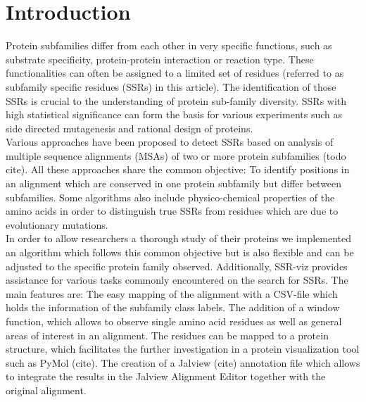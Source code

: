 \documentclass{bioinfo}
\begin{document}
\maketitle

\section{Introduction}

Protein subfamilies differ from each other in very specific functions, such as substrate specificity,
protein-protein interaction or reaction type. These functionalities can often be assigned 
to a limited set of residues (referred to as subfamily specific residues (SSRs) in this article).
The identification of those SSRs is crucial to the understanding of protein sub-family diversity.
SSRs with high statistical significance can form the basis for various experiments 
such as side directed mutagenesis and rational design of proteins. \\
%
Various approaches have been proposed to detect SSRs based on analysis of multiple sequence 
alignments (MSAs) of two or more protein subfamilies (todo cite). All these approaches share the 
common objective: To identify positions in an alignment which are conserved in one 
protein subfamily but differ between subfamilies. Some algorithms also include
physico-chemical properties of the amino acids in order to distinguish
true SSRs from residues which are due to evolutionary mutations. \\
%
In order to allow researchers a thorough study of their proteins we implemented an algorithm 
which follows this common objective but is also flexible and can be adjusted to the specific 
protein family observed.
Additionally, SSR-viz provides assistance for various tasks commonly encountered on the search for SSRs.
The main features are: The easy mapping of the alignment with a CSV-file which holds the information of 
the subfamily class labels. The addition of a window function, which allows to observe
single amino acid residues as well as general areas of interest in an alignment.
The residues can be mapped to a protein structure, which facilitates the
further investigation in a protein visualization tool such as PyMol (cite).
The creation of a Jalview (cite) annotation file which allows to integrate the results 
in the Jalview Alignment Editor together with the original alignment.
%
\end{document}
